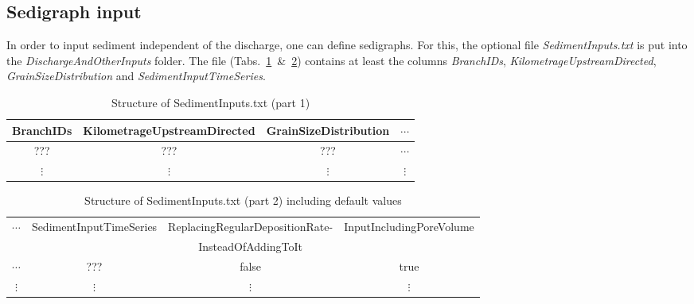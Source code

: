 \documentclass[11pt,a4paper]{article}
\newcommand{\tablefontsize}[0]{\small}
\begin{document}
\subsection{Sedigraph input}\label{SedigraphInput}
In order to input sediment independent of the discharge, one can define sedigraphs. For this, the optional file \emph{SedimentInputs.txt} is put into the \emph{DischargeAndOtherInputs} folder. The file (Tabs.~\ref{SedimentInputs1}~\&{}~\ref{SedimentInputs2}) contains at least the columns \emph{BranchIDs}, \emph{KilometrageUpstreamDirected}, \emph{GrainSizeDistribution} and \emph{SedimentInputTimeSeries}.

\begin{table}[h]
\caption{Structure of SedimentInputs.txt (part 1)}
\label{SedimentInputs1}
\vskip4mm
\tablefontsize
\centering
\begin{tabular}{c|c|c|c}
\hline\hline
BranchIDs & KilometrageUpstreamDirected & GrainSizeDistribution & $\cdots$\\
\hline
??? & ??? & ??? & $\cdots$\\
\hline
$\vdots$ & $\vdots$ & $\vdots$ & $\vdots$\\
\hline\hline
\end{tabular}
\end{table}


\begin{table}[h]
\caption{Structure of SedimentInputs.txt (part 2) including default values}
\label{SedimentInputs2}
\vskip4mm
\tablefontsize
\begin{adjustwidth}{-4cm}{-4cm}
\centering
\begin{tabular}{c|c|c|c}
\hline\hline
\multirow{2}{*}{$\cdots$} & \multirow{2}{*}{SedimentInputTimeSeries} & ReplacingRegularDepositionRate- & \multirow{2}{*}{InputIncludingPoreVolume}\\
 & & InsteadOfAddingToIt & \\
\hline
$\cdots$ & ??? & false & true\\
\hline
$\vdots$ & $\vdots$ & $\vdots$ & $\vdots$\\
\hline\hline
\end{tabular}
\end{adjustwidth}
\end{table}
\end{document}
